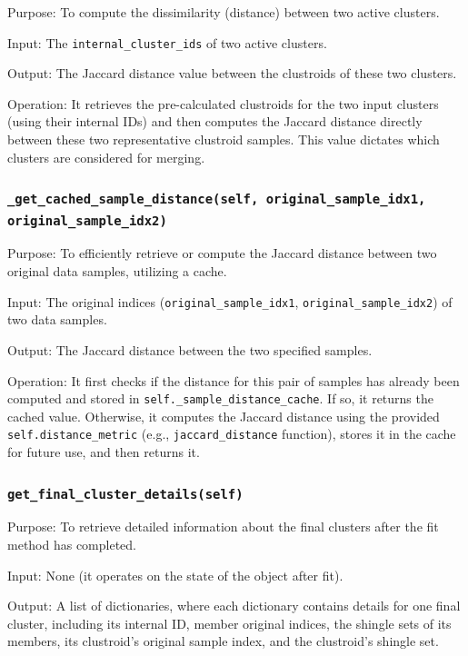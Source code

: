 Purpose: To compute the dissimilarity (distance) between two active clusters.

Input: The \texttt{internal\_cluster\_ids} of two active clusters.

Output: The Jaccard distance value between the clustroids of these two clusters.

Operation: It retrieves the pre-calculated clustroids for the two input clusters (using their internal IDs) and then computes the Jaccard distance directly between these two representative clustroid samples.
This value dictates which clusters are considered for merging.

\subsubsection{\texttt{\_get\_cached\_sample\_distance(self, original\_sample\_idx1, original\_sample\_idx2)}}\text{}

Purpose: To efficiently retrieve or compute the Jaccard distance between two original data samples, utilizing a cache.

Input: The original indices (\texttt{original\_sample\_idx1}, \texttt{original\_sample\_idx2}) of two data samples.

Output: The Jaccard distance between the two specified samples.

Operation: It first checks if the distance for this pair of samples has already been computed and stored in \texttt{self.\_sample\_distance\_cache}.
If so, it returns the cached value.
Otherwise, it computes the Jaccard distance using the provided \texttt{self.distance\_metric} (e.g., \texttt{jaccard\_distance} function), stores it in the cache for future use, and then returns it.

\subsubsection{\texttt{get\_final\_cluster\_details(self)}}\text{}

Purpose: To retrieve detailed information about the final clusters after the fit method has completed.

Input: None (it operates on the state of the object after fit).

Output: A list of dictionaries, where each dictionary contains details for one final cluster, including its internal ID, member original indices, the shingle sets of its members, its clustroid's original sample index, and the clustroid's shingle set.

